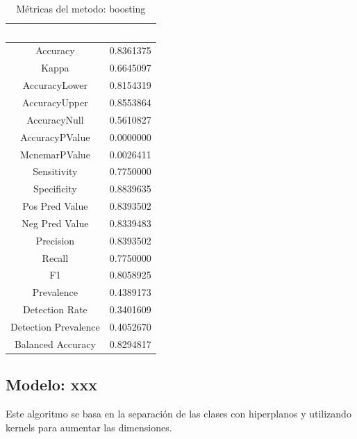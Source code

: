 \begin{table}[!h]
	
	\caption{\label{tab:metricas_boosting}Métricas del metodo: boosting }
	\centering
	\begin{tabular}[t]{cc}
		\toprule
		\rowcolor{black}  \multicolumn{1}{c}{\textcolor{white}{\textbf{metricas}}} & \multicolumn{1}{c}{\textcolor{white}{\textbf{valor}}}\\
		\midrule
		\rowcolor{gray!6}  Accuracy & 0.8361375\\
		Kappa & 0.6645097\\
		\rowcolor{gray!6}  AccuracyLower & 0.8154319\\
		AccuracyUpper & 0.8553864\\
		\rowcolor{gray!6}  AccuracyNull & 0.5610827\\
		\addlinespace
		AccuracyPValue & 0.0000000\\
		\rowcolor{gray!6}  McnemarPValue & 0.0026411\\
		Sensitivity & 0.7750000\\
		\rowcolor{gray!6}  Specificity & 0.8839635\\
		Pos Pred Value & 0.8393502\\
		\addlinespace
		\rowcolor{gray!6}  Neg Pred Value & 0.8339483\\
		Precision & 0.8393502\\
		\rowcolor{gray!6}  Recall & 0.7750000\\
		F1 & 0.8058925\\
		\rowcolor{gray!6}  Prevalence & 0.4389173\\
		\addlinespace
		Detection Rate & 0.3401609\\
		\rowcolor{gray!6}  Detection Prevalence & 0.4052670\\
		Balanced Accuracy & 0.8294817\\
		\bottomrule
	\end{tabular}
\end{table}



\subsection{Modelo: xxx}

Este algoritmo se basa en la separación de las clases con hiperplanos y
utilizando kernels para aumentar las dimensiones.

